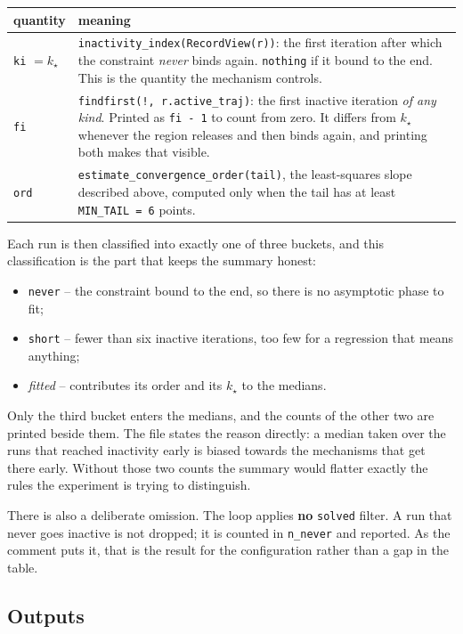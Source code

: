 \documentclass[11pt,a4paper]{article}
\newcommand{\jl}[1]{\texttt{\small #1}}
\begin{document}
\begin{longtable}{@{}p{34mm}p{112mm}@{}}
\toprule
\textbf{quantity} & \textbf{meaning} \\
\midrule
\endhead
\jl{ki} $=k_\star$ &
\jl{inactivity\_index(RecordView(r))}: the first iteration after which the
constraint \emph{never} binds again. \jl{nothing} if it bound to the end. This is
the quantity the mechanism controls. \\[3pt]
\jl{fi} &
\jl{findfirst(!, r.active\_traj)}: the first inactive iteration \emph{of any kind}.
Printed as \jl{fi - 1} to count from zero. It differs from $k_\star$ whenever the
region releases and then binds again, and printing both makes that visible. \\[3pt]
\jl{ord} &
\jl{estimate\_convergence\_order(tail)}, the least-squares slope described above,
computed only when the tail has at least \jl{MIN\_TAIL = 6} points. \\
\bottomrule
\end{longtable}

Each run is then classified into exactly one of three buckets, and this
classification is the part that keeps the summary honest:

\begin{itemize}[leftmargin=6mm,itemsep=2pt]
  \item \jl{never} -- the constraint bound to the end, so there is no asymptotic
        phase to fit;
  \item \jl{short} -- fewer than six inactive iterations, too few for a regression
        that means anything;
  \item \emph{fitted} -- contributes its order and its $k_\star$ to the medians.
\end{itemize}

Only the third bucket enters the medians, and the counts of the other two are
printed beside them. The file states the reason directly: a median taken over the
runs that reached inactivity early is biased towards the mechanisms that get there
early. Without those two counts the summary would flatter exactly the rules the
experiment is trying to distinguish.

There is also a deliberate omission. The loop applies \textbf{no} \jl{solved}
filter. A run that never goes inactive is not dropped; it is counted in
\jl{n\_never} and reported. As the comment puts it, that is the result for the
configuration rather than a gap in the table.

\subsection{Outputs}
\end{document}
